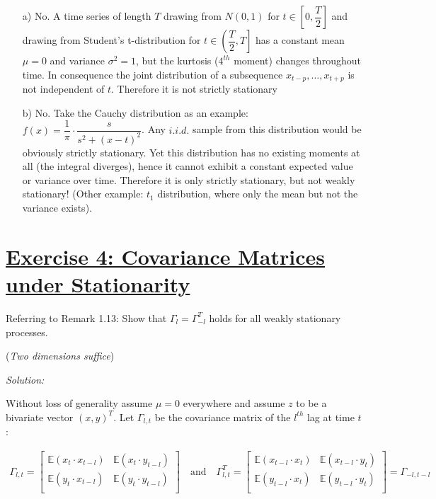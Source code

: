 \documentclass[12pt,a4paper]{article}
\newcommand{\tmpsection}[1]{}
\let\tmpsection=\section
\renewcommand{\section}[1]{\tmpsection{\underline{#1}} }
\begin{document}
\begin{itemize}
    \item[a)] No. A time series of length $T$ drawing from $N(0, 1)$ for $t \in \left[0, \dfrac{T}{2} \right]$ and drawing from Student’s t-distribution for $t \in \left(\dfrac{T}{2}, T \right]$ has a constant mean $\mu = 0$ and variance $\sigma^2 = 1$, but the kurtosis ($4^{th}$ moment) changes throughout time. In consequence the joint distribution of a subsequence $x_{t-p}, \ldots , x_{t+p}$ is not independent of $t$. Therefore it is not strictly stationary
    \item[b)] No. Take the Cauchy distribution as an example: $f(x) = \dfrac{1}{\pi} \cdot \dfrac{s}{s^2 + (x -t)^2}$. Any $i.i.d.$ sample from this distribution would be obviously strictly stationary. Yet this distribution has no existing moments at all (the integral diverges), hence it cannot exhibit a constant expected value or variance over time. Therefore it is only strictly stationary, but not weakly stationary! (Other example: $t_1$ distribution, where only the mean but not the variance exists).
\end{itemize}

\hypertarget{exercise-4-covariance-matrices-under-stationarity}{%
\section{Exercise 4: Covariance Matrices under
Stationarity}\label{exercise-4-covariance-matrices-under-stationarity}}

Referring to Remark 1.13: Show that \(\Gamma_l = \Gamma^{T}_{-l}\) holds
for all weakly stationary processes.

(\emph{Two dimensions suffice})

\emph{Solution:}

Without loss of generality assume \(\mu = 0\) everywhere and assume
\(z\) to be a bivariate vector \((x,y)^T\). Let \(\Gamma_{l,t}\) be the
covariance matrix of the \(l^{th}\) lag at time \(t\):

\begin{align*}
\Gamma_{l,t} = 
\begin{bmatrix}
  \mathbb{E}(x_t \cdot x_{t-l}) & \mathbb{E}(x_t \cdot y_{t-l}) \\
  \mathbb{E}(y_t \cdot x_{t-l}) & \mathbb{E}(y_t \cdot y_{t-l}) \\
\end{bmatrix}
\quad \text{and} \quad 
\Gamma_{l,t}^{T} = 
\begin{bmatrix}
  \mathbb{E}(x_{t-l} \cdot x_t ) & \mathbb{E}(x_{t-l} \cdot y_t) \\
  \mathbb{E}(y_{t-l} \cdot x_t  ) & \mathbb{E}( y_{t-l} \cdot y_t) \\
\end{bmatrix}
= \Gamma_{-l, t- l}
\end{align*}
\end{document}
